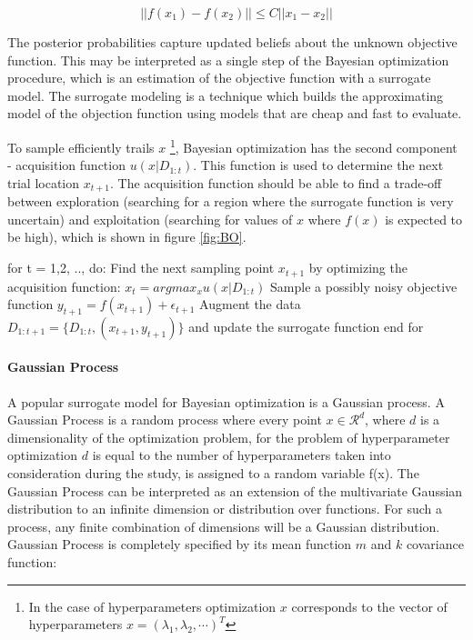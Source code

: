 \begin{equation}
||f(x_1)-f(x_2)|| \leq C ||x_1-x_2|| 
\end{equation}

The posterior probabilities capture updated beliefs about the unknown objective function. 
This may be interpreted as a single step of the Bayesian optimization procedure, which is an estimation of the objective function with a surrogate model. The surrogate modeling is a technique which builds the approximating model of the objection function using models that are cheap and fast to evaluate. 

To sample efficiently trails $x$ \footnote{In the case of hyperparameters optimization $x$ corresponds to the vector of hyperparameters $x= (\lambda_1, \lambda_2, \cdots)^{T}$}, Bayesian optimization has the second component - acquisition function $u(x|D_{1:t})$. This function is used to determine the next trial location $x_{t+1}$. The acquisition function should be able to find a trade-off between exploration (searching for a region where the surrogate function is very uncertain) and exploitation (searching for values of $x$ where $f(x)$ is expected to be high), which is shown in figure \ref{fig:BO}. 

\begin{algorithm}[caption={Bayesian Optimization}, 
\label={alg:Bayesian Optimization}]
for t = 1,2, .., do:
   Find the next sampling point $x_{t+1}$ by optimizing the acquisition function: $x_t = argmax_x u(x| D_{1:t}) $
   Sample a possibly noisy objective function $y_{t+1} = f(x_{t+1}) + \epsilon_{t+1}$ 
   Augment the data $D_{1:t+1}= \{ D_{1:t}, (x_{t+1},y_{t+1} ) \} $ and update the surrogate function
end for
\end{algorithm}

\paragraph{Gaussian Process} \mbox{}

A popular surrogate model for Bayesian optimization is a Gaussian process. 
A Gaussian Process is a random process where every point $x \in \mathcal{R}^{d}$, where $d$ is a dimensionality of the optimization problem, for the problem of hyperparameter optimization $d$ is equal to the number of hyperparameters taken into consideration during the study, 
is assigned to a random variable f(x). The Gaussian Process can be interpreted as an extension of the multivariate Gaussian distribution to an infinite dimension or distribution over functions. For such a process, any finite combination of dimensions will be a Gaussian distribution. Gaussian Process is completely specified by its mean function $m$ and $k$ covariance function: 

